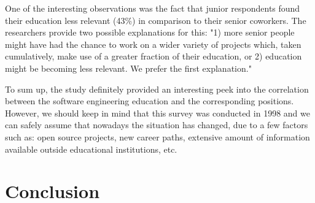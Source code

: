 \documentclass{report}
\begin{document}
One of the interesting observations was the fact that junior respondents found their education less relevant (43\%) in comparison to their senior coworkers. The researchers provide two possible explanations for this: "1) more senior people might have had the chance to work on a wider variety of projects which, taken cumulatively, make use of a greater fraction of their education, or 2) education might be becoming less relevant. We prefer the first explanation." \cite{lethbridge}

To sum up, the study definitely provided an interesting peek into the correlation between the software engineering education and the corresponding positions. However, we should keep in mind that this survey was conducted in 1998 and we can safely assume that nowadays the situation has changed, due to a few factors such as: open source projects, new career paths, extensive amount of information available outside educational institutions, etc.

\chapter{Conclusion}


{}

\end{document}
